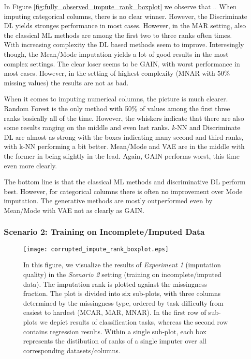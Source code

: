 In Figure \ref{fig:fully_observed_impute_rank_boxplot} we observe that ..
When imputing categorical columns, there is no clear winner. However, the Discriminate DL yields stronges performance in most cases. However, in the MAR setting, also the classical ML methods are among the first two to three ranks often times. With increasing complexity the DL based methods seem to improve. Interesingly though, the Mean/Mode imputation yields a lot of good results in the most complex settings.
The clear loser seems to be GAIN, with worst performance in most cases. However, in the setting of highest complexity (MNAR with 50\% missing values) the results are not as bad.

When it comes to imputing numerical columns, the picture is much clearer. Random Forest is the only method with 50\% of values among the first three ranks basically all of the time. However, the whiskers indicate that there are also some results ranging on the middle and even last ranks. \textit{k}-NN and Discriminate DL are almost as strong with the boxes indicating many second and third ranks, with k-NN performing a bit better. Mean/Mode and VAE are in the middle with the former in being slightly in the lead. Again, GAIN performs worst, this time even more clearly.

The bottom line is that the classical ML methods and discriminative DL perform best. However, for categorical columns there is often no improvement over Mode imputation. The generative methods are mostly outperformed even by Mean/Mode with VAE not as clearly as GAIN.



\subsubsection{Scenario 2: Training on Incomplete/Imputed Data}


\begin{figure}\centering
    \texttt{[image: corrupted\_impute\_rank\_boxplot.eps]}

    \caption[Imputation Ranks - Corrupted]{In this figure, we visualize the results of \textit{Experiment 1} (imputation quality) in the \textit{Scenario 2} setting (training on incomplete/imputed data). The imputation rank is plotted against the missingness fraction. The plot is divided into six sub-plots, with three columns determined by the missingness type, ordered by task difficulty from easiest to hardest (MCAR, MAR, MNAR). In the first row of sub-plots we depict results of classification tasks, whereas the second row contains regression results. Within a single sub-plot, each box represents the distibution of ranks of a single imputer over all corresponding datasets/columns.
    }
	\label{fig:corrupted_impute_rank_boxplot}
\end{figure}

